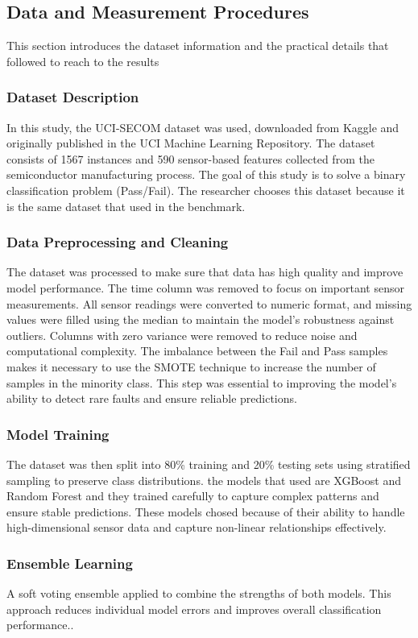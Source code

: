 \documentclass[12pt,oneside]{article}
\begin{document}
\subsection{Data and Measurement Procedures}
This section introduces the dataset information and the practical details that followed to reach to the results
\subsubsection{Dataset Description}
In this study, the UCI-SECOM dataset was used, downloaded from Kaggle and originally published in the UCI Machine Learning Repository. The dataset consists of 1567 instances and 590 sensor-based features collected from the semiconductor manufacturing process. The goal of this study is to solve a binary classification problem (Pass/Fail). The researcher chooses this dataset because it is the same dataset that used in the benchmark.
\subsubsection{Data Preprocessing and Cleaning}
The dataset was processed to make sure that data has high quality and improve model performance. The time column was removed to focus on important sensor measurements. All sensor readings were converted to numeric format, and missing values were filled using the median to maintain the model's robustness against outliers. Columns with zero variance were removed to reduce noise and computational complexity.
The imbalance between the Fail and Pass samples makes it necessary to use the SMOTE technique to increase the number of samples in the minority class. This step was essential to improving the model's ability to detect rare faults and ensure reliable predictions.


\subsubsection{Model Training}
The dataset was then split into 80\% training and 20\% testing sets using stratified sampling to preserve class distributions. the models that used are XGBoost and Random Forest and they trained carefully to capture complex patterns and ensure stable predictions. These models chosed because of their ability to handle high-dimensional sensor data and capture non-linear relationships effectively.

\subsubsection{Ensemble Learning}
A soft voting ensemble applied to combine the strengths of both models. This approach reduces individual model errors and improves overall classification performance..
\end{document}
